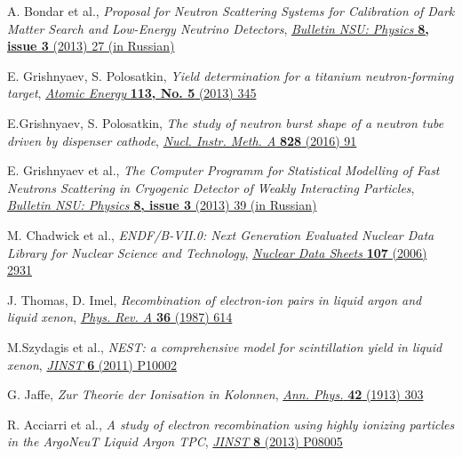 \documentclass[a4paper,11pt]{article}
\begin{document}
\begin{thebibliography}{99}
A. Bondar et al., \emph{Proposal for Neutron Scattering Systems for Calibration of Dark Matter Search and Low-Energy Neutrino Detectors}, \href{}{\emph{Bulletin NSU: Physics} {\bf 8, issue 3} (2013) 27 (in Russian)}

E. Grishnyaev, S. Polosatkin, \emph{Yield determination for a titanium neutron-forming target}, \href{}{\emph{Atomic Energy} {\bf 113, No. 5} (2013) 345}

E.Grishnyaev, S. Polosatkin, \emph{The study of neutron burst shape of a neutron tube driven by dispenser cathode}, \href{https://doi.org/10.1016/j.nima.2016.05.021}{\emph{Nucl. Instr. Meth. A} {\bf 828} (2016) 91}



E. Grishnyaev et al., \emph{The Computer Programm for Statistical Modelling of Fast Neutrons Scattering in Cryogenic Detector of Weakly Interacting Particles}, \href{}{\emph{Bulletin NSU: Physics} {\bf 8, issue 3} (2013) 39 (in Russian)}

M. Chadwick et al., \emph{ENDF/B-VII.0: Next Generation Evaluated Nuclear Data Library for Nuclear Science and Technology}, \href{https://doi.org/10.1016/j.nds.2006.11.001}{\emph{Nuclear Data Sheets} {\bf 107} (2006) 2931}

J. Thomas, D. Imel, \emph{Recombination of electron-ion pairs in liquid argon and liquid xenon}, \href{https://doi.org/10.1103/PhysRevA.36.614}{\emph{Phys. Rev. A} {\bf 36} (1987) 614}

M.Szydagis et al., \emph{NEST: a comprehensive model for scintillation yield in liquid xenon}, \href{https://doi.org/10.1088/1748-0221/6/10/P10002}{\emph{JINST} {\bf 6} (2011) P10002}

G. Jaffe, \emph{Zur Theorie der Ionisation in Kolonnen}, \href{https://doi.org/10.1002/andp.19133471205}{\emph{Ann. Phys.} {\bf 42} (1913) 303}

R. Acciarri et al., \emph{A study of electron recombination using highly ionizing particles in the ArgoNeuT Liquid Argon TPC}, \href{https://doi.org/10.1088/1748-0221/8/08/P08005}{\emph{JINST} {\bf 8} (2013) P08005}


\end{thebibliography}
\end{document}
